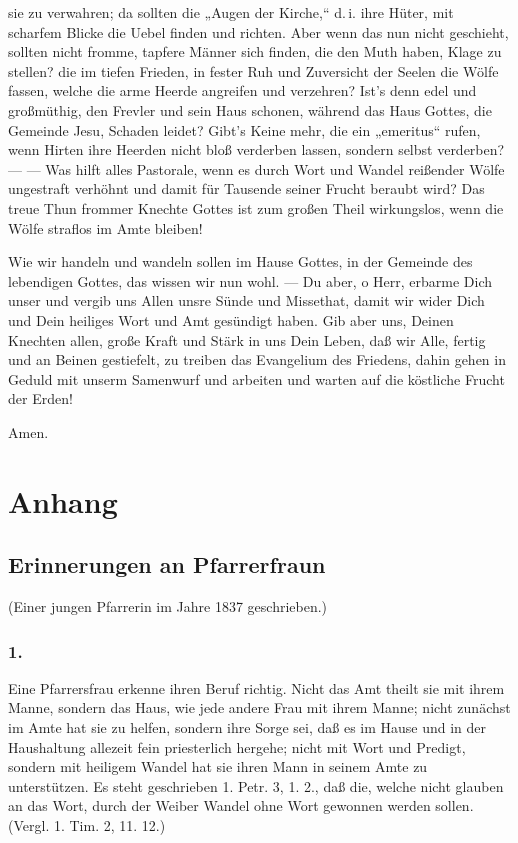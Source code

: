 sie zu verwahren; da sollten die „Augen der Kirche,“ d.\,i. ihre Hüter, mit scharfem Blicke die Uebel finden und richten. Aber wenn das nun nicht geschieht, sollten nicht fromme, tapfere Männer sich finden, die den Muth haben, Klage zu stellen? die im tiefen Frieden, in fester Ruh und Zuversicht der Seelen die Wölfe fassen, welche die arme Heerde angreifen und verzehren? Ist’s denn edel und großmüthig, den Frevler und sein Haus schonen, während das Haus Gottes, die Gemeinde Jesu, Schaden leidet? Gibt’s Keine mehr, die ein „emeritus“ rufen, wenn Hirten ihre Heerden nicht bloß verderben lassen, sondern selbst verderben? — — Was hilft alles Pastorale, wenn es durch Wort und Wandel reißender Wölfe ungestraft verhöhnt und damit für Tausende seiner Frucht beraubt wird? Das treue Thun frommer Knechte Gottes ist zum großen Theil wirkungslos, wenn die Wölfe straflos im Amte bleiben!

Wie wir handeln und wandeln sollen im Hause Gottes, in der Gemeinde des lebendigen Gottes, das wissen wir nun wohl. — Du aber, o Herr, erbarme Dich unser und vergib uns Allen unsre Sünde und Missethat, damit wir wider Dich und Dein heiliges Wort und Amt gesündigt haben. Gib aber uns, Deinen Knechten allen, große Kraft und Stärk in uns Dein Leben, daß wir Alle, fertig und an Beinen gestiefelt, zu treiben das Evangelium des Friedens, dahin gehen in Geduld mit unserm Samenwurf und arbeiten und warten auf die köstliche Frucht der Erden!

Amen.

\chapter{Anhang}


\section{Erinnerungen an Pfarrerfraun}

\begin{center}
(Einer jungen Pfarrerin im Jahre 1837 geschrieben.)
\end{center}

\subsection{1.}

Eine Pfarrersfrau erkenne ihren Beruf richtig. Nicht das Amt theilt sie mit ihrem Manne, sondern das Haus, wie jede andere Frau mit ihrem Manne; nicht zunächst im Amte hat sie zu helfen, sondern ihre Sorge sei, daß es im Hause und in der Haushaltung allezeit fein priesterlich hergehe; nicht mit Wort und Predigt, sondern mit heiligem Wandel hat sie ihren Mann in seinem Amte zu unterstützen. Es steht geschrieben 1. Petr. 3, 1. 2., daß die, welche nicht glauben an das Wort, durch der Weiber Wandel ohne Wort gewonnen werden sollen. (Vergl. 1. Tim. 2, 11. 12.)

